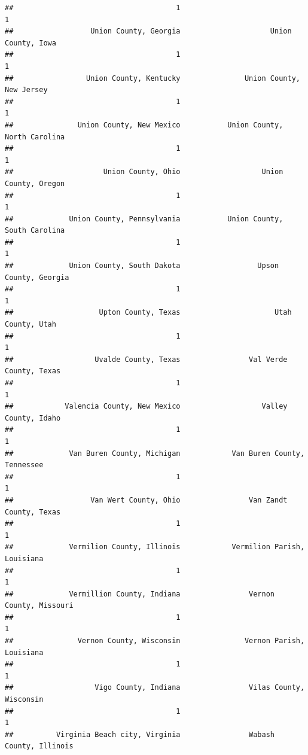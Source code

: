 \documentclass[
]{article}
\begin{document}
\begin{verbatim}
##                                      1                                      1 
##                  Union County, Georgia                     Union County, Iowa 
##                                      1                                      1 
##                 Union County, Kentucky               Union County, New Jersey 
##                                      1                                      1 
##               Union County, New Mexico           Union County, North Carolina 
##                                      1                                      1 
##                     Union County, Ohio                   Union County, Oregon 
##                                      1                                      1 
##             Union County, Pennsylvania           Union County, South Carolina 
##                                      1                                      1 
##             Union County, South Dakota                  Upson County, Georgia 
##                                      1                                      1 
##                    Upton County, Texas                      Utah County, Utah 
##                                      1                                      1 
##                   Uvalde County, Texas                Val Verde County, Texas 
##                                      1                                      1 
##            Valencia County, New Mexico                   Valley County, Idaho 
##                                      1                                      1 
##             Van Buren County, Michigan            Van Buren County, Tennessee 
##                                      1                                      1 
##                  Van Wert County, Ohio                Van Zandt County, Texas 
##                                      1                                      1 
##             Vermilion County, Illinois            Vermilion Parish, Louisiana 
##                                      1                                      1 
##             Vermillion County, Indiana                Vernon County, Missouri 
##                                      1                                      1 
##               Vernon County, Wisconsin               Vernon Parish, Louisiana 
##                                      1                                      1 
##                   Vigo County, Indiana                Vilas County, Wisconsin 
##                                      1                                      1 
##          Virginia Beach city, Virginia                Wabash County, Illinois 

\end{verbatim}
\end{document}
